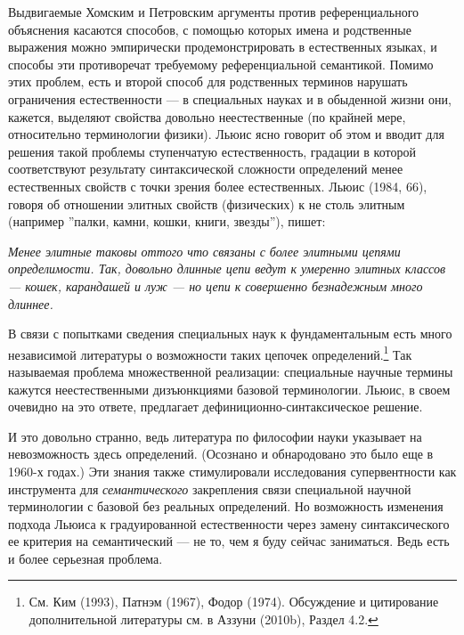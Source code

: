 \documentclass[11pt]{book}
\begin{document}
Выдвигаемые Хомским и Петровским аргументы против референциального объяснения касаются способов, с помощью которых имена и родственные выражения можно эмпирически продемонстрировать в естественных языках, и способы эти противоречат требуемому референциальной семантикой. Помимо этих проблем, есть и второй способ для родственных терминов нарушать ограничения естественности --- в специальных науках и в обыденной жизни они, кажется, выделяют свойства довольно неестественные (по крайней мере, относительно терминологии физики). Льюис ясно говорит об этом и вводит для решения такой проблемы ступенчатую естественность, градации в которой соответствуют результату синтаксической сложности определений менее естественных свойств с точки зрения более естественных. Льюис (1984, 66), говоря об отношении элитных свойств (физических) к не столь элитным (например ''палки, камни, кошки, книги, звезды''), пишет:

\smallskip

\textit{Менее элитные таковы оттого что связаны с более элитными цепями определимости. Так, довольно длинные цепи ведут к умеренно элитных классов --- кошек, карандашей и луж --- но цепи к совершенно безнадежным много длиннее.}

\smallskip

В связи с попытками сведения специальных наук к фундаментальным есть много независимой литературы о возможности таких цепочек определений.\footnote{См. Ким (1993), Патнэм (1967), Фодор (1974). Обсуждение и цитирование дополнительной литературы см. в Аззуни (2010b), Раздел 4.2.} Так называемая проблема множественной реализации: специальные научные термины кажутся неестественными дизъюнкциями базовой терминологии. Льюис, в своем очевидно на это ответе, предлагает дефиниционно-синтаксическое решение.

И это довольно странно, ведь литература по философии науки указывает на невозможность здесь определений. (Осознано и обнародовано это было еще в 1960-х годах.) Эти знания также стимулировали исследования супервентности как инструмента для \textit{семантического} закрепления связи специальной научной терминологии с базовой без реальных определений. Но возможность изменения подхода Льюиса к градуированной естественности через замену синтаксического ее критерия на семантический --- не то, чем я буду сейчас заниматься. Ведь есть и более серьезная проблема.
\end{document}

